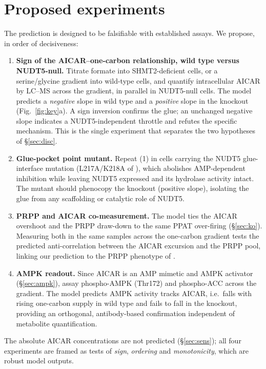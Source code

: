 \documentclass[a4paper,fleqn]{cas-sc}
\begin{document}
\section{Proposed experiments}
\label{sec:exp}

The prediction is designed to be falsifiable with established assays. We propose,
in order of decisiveness:

\begin{enumerate}
\item \textbf{Sign of the AICAR--one-carbon relationship, wild type versus
NUDT5-null.} Titrate formate into SHMT2-deficient cells, or a serine/glycine
gradient into wild-type cells, and quantify intracellular AICAR by LC--MS across
the gradient, in parallel in NUDT5-null cells. The model predicts a
\emph{negative} slope in wild type and a \emph{positive} slope in the knockout
(Fig.~\ref{fig:key}a). A sign inversion confirms the glue; an unchanged negative
slope indicates a NUDT5-independent throttle and refutes the specific mechanism.
This is the single experiment that separates the two hypotheses of
\S\ref{sec:disc}.
\item \textbf{Glue-pocket point mutant.} Repeat (1) in cells carrying the
NUDT5 glue-interface mutation (L217A/K218A of \citealp{witus2026}), which abolishes
AMP-dependent inhibition while leaving NUDT5 expressed and its hydrolase activity
intact. The mutant should phenocopy the knockout (positive slope), isolating the
glue from any scaffolding or catalytic role of NUDT5.
\item \textbf{PRPP and AICAR co-measurement.} The model ties the AICAR overshoot
and the PRPP draw-down to the same PPAT over-firing (\S\ref{sec:ko}). Measuring
both in the same samples across the one-carbon gradient tests the predicted
anti-correlation between the AICAR excursion and the PRPP pool, linking our
prediction to the PRPP phenotype of \citet{strefeler2025}.
\item \textbf{AMPK readout.} Since AICAR is an AMP mimetic and AMPK activator
(\S\ref{sec:ampk}), assay phospho-AMPK (Thr172) and phospho-ACC across the
gradient. The model predicts AMPK activity tracks AICAR, i.e.\ falls with rising
one-carbon supply in wild type and fails to fall in the knockout, providing an
orthogonal, antibody-based confirmation independent of metabolite quantification.
\end{enumerate}

The absolute AICAR concentrations are not predicted (\S\ref{sec:sens}); all four
experiments are framed as tests of \emph{sign}, \emph{ordering} and
\emph{monotonicity}, which are robust model outputs.
\end{document}
